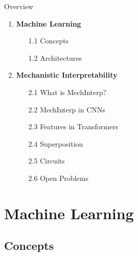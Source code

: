 \newcommand{\navparent}[4]{%
  \ifnum#3<#1\relax
    \textcolor{gray}{#4}%
  \else
    \ifnum#3>#2\relax
      #4%
    \else
      \textbf{\large #4}%
    \fi
  \fi
}


\begin{frame}{Overview}
\begin{enumerate}
  \item \textbf{Machine Learning}
  \begin{enumerate}
    \item[1.1] Concepts
    \item[1.2] Architectures
  \end{enumerate}
  \item \textbf{Mechanistic Interpretability}
  \begin{enumerate}
    \item[2.1] What is MechInterp?
    \item[2.2] MechInterp in CNNs
    \item[2.3] Features in Transformers
    \item[2.4] Superposition
    \item[2.5] Circuits
    \item[2.6] Open Problems
  \end{enumerate}
\end{enumerate}
\end{frame}

\section{Machine Learning}

\subsection{Concepts}


